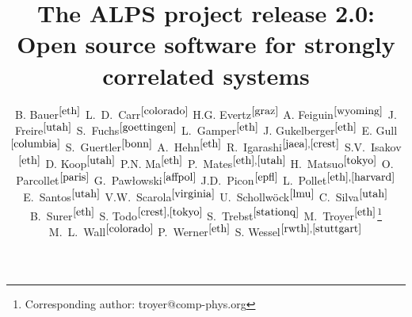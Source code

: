 \documentclass[12pt]{iopart}
\begin{document}
\lstset{language=Python,basicstyle=\scriptsize,numbers=left,stepnumber=5,numberfirstline=true}

\title{The ALPS project release 2.0: \\ Open source software for strongly correlated systems}

\newcommand{\myauthor}[3]{#2$^{#1}$}
\newcommand{\myaddress}[2]{\address{\refstepcounter{affiliation} $^{\arabic{affiliation}}$#2 \label{#1}}}

\author{
	\myauthor{\ref{eth}}{B. Bauer}{bauerb@phys.ethz.ch}
	\myauthor{\ref{colorado}}{L.~D.~Carr}{lcarr@mines.edu}
	\myauthor{\ref{graz}}{H.G. Evertz}{evertz@tugraz.at}
	\myauthor{\ref{wyoming}}{A. Feiguin}{afeiguin@uwyo.edu}
	\myauthor{\ref{utah}}{J. Freire}{juliana@cs.utah.edu}
	\myauthor{\ref{goettingen}}{S.~Fuchs}{fuchs@theorie.physik.uni-goettingen.de}
	\myauthor{\ref{eth}}{L.~Gamper}{gamperl@gmail.com}
	\myauthor{\ref{eth}}{J. Gukelberger}{gukelberger@phys.ethz.ch}
	\myauthor{\ref{columbia}}{E. Gull}{gull@phys.columbia.edu}
	\myauthor{\ref{bonn}}{S.~Guertler}{guertler@th.physik.uni-bonn.de}
	\myauthor{\ref{eth}}{A.~Hehn}{hehn@phys.ethz.ch}
	\myauthor{\ref{jaea},\ref{crest}}{R.~Igarashi}{rigarash@hosi.phys.s.u-tokyo.ac.jp}
	\myauthor{\ref{eth}}{S.V.~Isakov}{isakov@phys.ethz.ch}
	\myauthor{\ref{utah}}{D. Koop}{dakoop@cs.utah.edu}
	\myauthor{\ref{eth}}{P.N. Ma}{pingnang@phys.ethz.ch}
	\myauthor{\ref{eth},\ref{utah}}{P.~Mates}{mates@sci.utah.edu}
	\myauthor{\ref{tokyo}}{H.~Matsuo}{halm@looper.t.u-tokyo.ac.jp}
	\myauthor{\ref{paris}}{O. Parcollet}{parcolle@spht.saclay.cea.fr}
	\myauthor{\ref{affpol}}{G.~Paw{\l}owski}{gpawlo@amu.edu.pl}
	\myauthor{\ref{epfl}}{J.D.~Picon}{jean-david.picon@epfl.chl}
	\myauthor{\ref{eth},\ref{harvard}}{L.~Pollet}{pollet@phys.ethz.ch}
	\myauthor{\ref{utah}}{E.~Santos}{emanuele@sci.utah.edu}
	\myauthor{\ref{virginia}}{V.W.~Scarola}{scarola@vt.edu}
	\myauthor{\ref{lmu}}{U.~Schollw\"ock}{schollwoeck@lmu.de}
	\myauthor{\ref{utah}}{C.~Silva}{csilva@sci.utah.edu}
	\myauthor{\ref{eth}}{B.~Surer}{surerb@phys.ethz.ch}
	\myauthor{\ref{crest},\ref{tokyo}}{S. Todo}{wistaria@ap.t.u-tokyo.ac.jp}
	\myauthor{\ref{stationq}}{S.~Trebst}{trebst@kitp.ucsb.edu}
	\myauthor{\ref{eth}}{M.~Troyer}{troyer@ethz.ch}\footnote{Corresponding author: troyer@comp-phys.org}
	\myauthor{\ref{colorado}}{M.~L.~Wall}{mwall@mymail.mines.edu}
	\myauthor{\ref{eth}}{P.~Werner}{werner@phys.ethz.ch}
	\myauthor{\ref{rwth},\ref{stuttgart}}{S. Wessel}{wessel@phys.ethz.ch}
}
\end{document}
